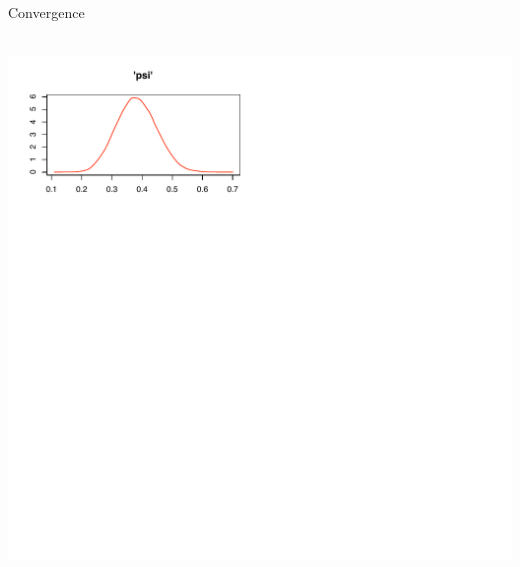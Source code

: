\documentclass{beamer}
\begin{document}
\begin{frame}{Convergence}
	\begin{center}
		 \\
		\includegraphics[scale=0.8]{Figures/R/distnConvergence.pdf} \\
	\end{center}
\end{frame}
\end{document}
